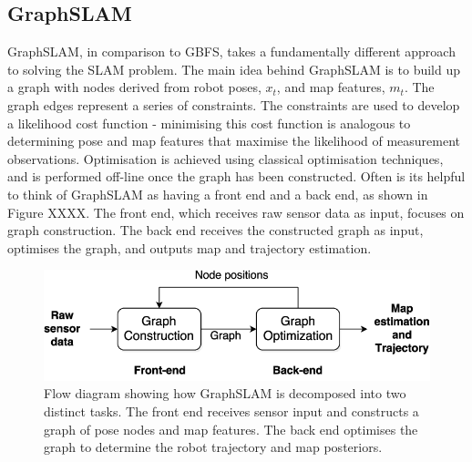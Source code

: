 \documentclass[a4paper]{article}
\begin{document}
\newpage

\subsection{GraphSLAM}
GraphSLAM, in comparison to GBFS, takes a fundamentally different approach to solving the SLAM problem. The main idea behind GraphSLAM is to build up a graph with nodes derived from robot poses, $x_t$, and map features, $m_t$. The graph edges represent a series of constraints. The constraints are used to develop a likelihood cost function - minimising this cost function is analogous to determining pose and map features that maximise the likelihood of measurement observations. Optimisation is achieved using classical optimisation techniques, and is performed off-line once the graph has been constructed. Often is its helpful to think of GraphSLAM as having a front end and a back end, as shown in Figure XXXX. The front end, which receives raw sensor data as input, focuses on graph construction. The back end receives the constructed graph as input, optimises the graph, and outputs map and trajectory estimation.
\begin{figure}[h]
\centering
\includegraphics[scale=0.35]{Graph-SLAM-system}
\caption{Flow diagram showing how GraphSLAM is decomposed into two distinct tasks. The front end receives sensor input and constructs a graph of pose nodes and map features. The back end optimises the graph to determine the robot trajectory and map posteriors.}
\end{figure}
\end{document}
